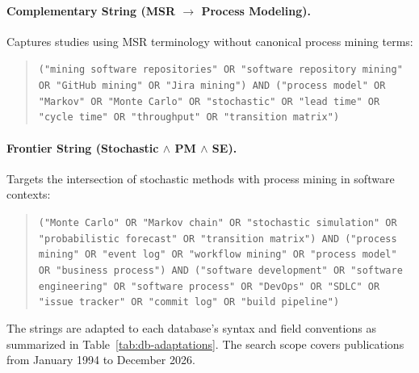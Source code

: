 \paragraph{Complementary String (MSR $\rightarrow$ Process Modeling).}
Captures studies using MSR terminology without canonical process mining terms:

\begin{quote}
\small
\texttt{("mining software repositories" OR "software repository mining" OR
"GitHub mining" OR "Jira mining") AND ("process model" OR "Markov" OR "Monte
Carlo" OR "stochastic" OR "lead time" OR "cycle time" OR "throughput" OR
"transition matrix")}
\end{quote}

\paragraph{Frontier String (Stochastic $\wedge$ PM $\wedge$ SE).}
Targets the intersection of stochastic methods with process mining in software
contexts:

\begin{quote}
\small
\texttt{("Monte Carlo" OR "Markov chain" OR "stochastic simulation" OR
"probabilistic forecast" OR "transition matrix") AND ("process mining" OR
"event log" OR "workflow mining" OR "process model" OR "business process") AND
("software development" OR "software engineering" OR "software process" OR
"DevOps" OR "SDLC" OR "issue tracker" OR "commit log" OR "build pipeline")}
\end{quote}

The strings are adapted to each database's syntax and field conventions as
summarized in Table~\ref{tab:db-adaptations}. The search scope covers
publications from January 1994 to December 2026.


